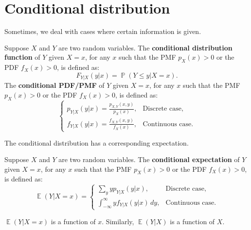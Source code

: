 \documentclass{huhtakm-template-book-v2}
\DeclareMathOperator{\prob}{\mathbb{P}}
\DeclareMathOperator{\E}{\mathbb{E}}
\begin{document}
\section{Conditional distribution}
    Sometimes, we deal with cases where certain information is given. 
    \begin{defn}
        Suppose $X$ and $Y$ are two random variables. The \textbf{conditional distribution function} of $Y$ given $X = x$, for any $x$ such that the PMF $p_{X}(x) > 0$ or the PDF $f_{X}(x) > 0$, is defined as:
        \begin{equation*}
            F_{Y|X}(y|x) = \prob(Y \leq y | X = x).
        \end{equation*}
        The \textbf{conditional PDF/PMF} of $Y$ given $X = x$, for any $x$ such that the PMF $p_{X}(x) > 0$ or the PDF $f_{X}(x) > 0$, is defined as:
        \begin{equation*}
            \begin{cases}
                p_{Y|X}(y|x) = \frac{p_{X,Y}(x, y)}{p_{X}(x)}, &\text{Discrete case},\\
                f_{Y|X}(y|x) = \frac{f_{X,Y}(x, y)}{f_{X}(x)}, &\text{Continuous case}.
            \end{cases}
        \end{equation*}
    \end{defn}
    The conditional distribution has a corresponding expectation.
    \begin{defn}
        Suppose $X$ and $Y$ are two random variables. The \textbf{conditional expectation} of $Y$ given $X = x$, for any $x$ such that the PMF $p_{X}(x) > 0$ or the PDF $f_{X}(x) > 0$, is defined as:
        \begin{equation*}
            \E(Y | X = x) = \begin{cases}
                \sum_{y} y p_{Y|X}(y|x), &\text{Discrete case},\\
                \int_{-\infty}^{\infty} y f_{Y|X}(y|x) \, dy, &\text{Continuous case}.
            \end{cases}
        \end{equation*}
    \end{defn}
    \begin{rem}
        $\E(Y | X = x)$ is a function of $x$. Similarly, $\E(Y | X)$ is a function of $X$.
    \end{rem}
\end{document}
